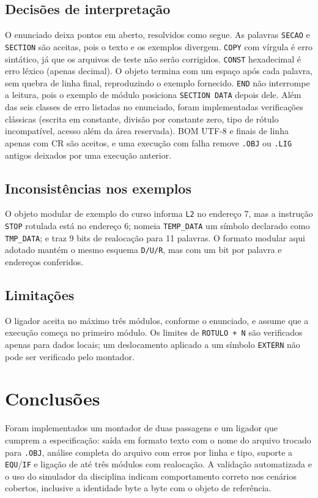 \documentclass[conference]{IEEEtran}
\begin{document}
\subsection{Decisões de interpretação}
O enunciado deixa pontos em aberto, resolvidos como segue. As palavras \texttt{SECAO} e \texttt{SECTION} são aceitas, pois o texto e os exemplos divergem. \texttt{COPY} com vírgula é erro sintático, já que os arquivos de teste não serão corrigidos. \texttt{CONST} hexadecimal é erro léxico (apenas decimal). O objeto termina com um espaço após cada palavra, sem quebra de linha final, reproduzindo o exemplo fornecido. \texttt{END} não interrompe a leitura, pois o exemplo de módulo posiciona \texttt{SECTION DATA} depois dele. Além das seis classes de erro listadas no enunciado, foram implementadas verificações clássicas (escrita em constante, divisão por constante zero, tipo de rótulo incompatível, acesso além da área reservada). BOM UTF-8 e finais de linha apenas com CR são aceitos, e uma execução com falha remove \texttt{.OBJ} ou \texttt{.LIG} antigos deixados por uma execução anterior.

\subsection{Inconsistências nos exemplos}
O objeto modular de exemplo do curso informa \texttt{L2} no endereço 7, mas a instrução \texttt{STOP} rotulada está no endereço 6; nomeia \texttt{TEMP\_DATA} um símbolo declarado como \texttt{TMP\_DATA}; e traz 9 bits de realocação para 11 palavras. O formato modular aqui adotado mantém o mesmo esquema \texttt{D/U/R}, mas com um bit por palavra e endereços conferidos.

\subsection{Limitações}
O ligador aceita no máximo três módulos, conforme o enunciado, e assume que a execução começa no primeiro módulo. Os limites de \texttt{ROTULO + N} são verificados apenas para dados locais; um deslocamento aplicado a um símbolo \texttt{EXTERN} não pode ser verificado pelo montador.

\section{Conclusões}
Foram implementados um montador de duas passagens e um ligador que cumprem a especificação: saída em formato texto com o nome do arquivo trocado para \texttt{.OBJ}, análise completa do arquivo com erros por linha e tipo, suporte a \texttt{EQU}/\texttt{IF} e ligação de até três módulos com realocação. A validação automatizada e o uso do simulador da disciplina indicam comportamento correto nos cenários cobertos, inclusive a identidade byte a byte com o objeto de referência.
\end{document}
